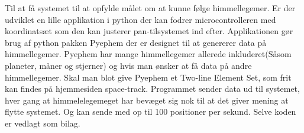 Til at få systemet til at opfylde målet om at kunne følge himmellegemer. Er der udviklet en lille applikation i python der kan fodrer microcontrolleren med koordinatsæt som den kan justerer pan-tilsystemet ind efter. Applikationen gør brug af python pakken Pyephem\cite{Pyephem} der er designet til at genererer data på himmellegemer. Pyephem har mange himmellegemer allerede inkluderet(Såsom planeter, måner og stjerner) og hvis man ønsker at få data på andre himmellegemer. Skal man blot give Pyephem et Two-line Element Set, som frit kan findes på hjemmesiden space-track\cite{https://www.space-track.org}. Programmet sender data ud til systemet, hver gang at himmelelegemeget har bevæget sig nok til at det giver mening at flytte systemet. Og kan sende med op til 100 positioner per sekund. Selve koden er vedlagt som bilag.